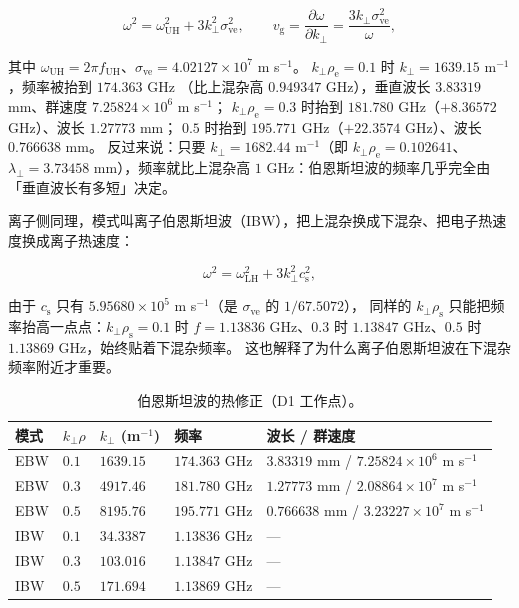 \begin{equation}
\omega^2=\omega_\mathrm{UH}^2+3k_\perp^2\sigma_\mathrm{ve}^2 ,
\qquad
v_\mathrm{g}=\frac{\partial\omega}{\partial k_\perp}=\frac{3k_\perp \sigma_\mathrm{ve}^2}{\omega} ,
\label{eq:app-at-ebw}
\end{equation}

其中 $\omega_\mathrm{UH}=2\pi f_\mathrm{UH}$、$\sigma_\mathrm{ve}=4.02127\times10^{7}$ m s$^{-1}$。
$k_\perp\rho_\mathrm{e}=0.1$ 时 $k_\perp=1639.15$ m$^{-1}$，频率被抬到 $174.363$ GHz
（比上混杂高 $0.949347$ GHz），垂直波长 $3.83319$ mm、群速度 $7.25824\times10^{6}$ m s$^{-1}$；
$k_\perp\rho_\mathrm{e}=0.3$ 时抬到 $181.780$ GHz（$+8.36572$ GHz）、波长 $1.27773$ mm；
$0.5$ 时抬到 $195.771$ GHz（$+22.3574$ GHz）、波长 $0.766638$ mm。
反过来说：只要 $k_\perp=1682.44$ m$^{-1}$（即 $k_\perp\rho_\mathrm{e}=0.102641$、
$\lambda_\perp=3.73458$ mm），频率就比上混杂高 $1$ GHz：伯恩斯坦波的频率几乎完全由
「垂直波长有多短」决定。

离子侧同理，模式叫离子伯恩斯坦波（IBW），把上混杂换成下混杂、把电子热速度换成离子热速度：

\begin{equation}
\omega^2=\omega_\mathrm{LH}^2+3k_\perp^2c_\mathrm{s}^2 ,
\label{eq:app-at-ibw}
\end{equation}

由于 $c_\mathrm{s}$ 只有 $5.95680\times10^{5}$ m s$^{-1}$（是 $\sigma_\mathrm{ve}$ 的 $1/67.5072$），
同样的 $k_\perp\rho_\mathrm{s}$ 只能把频率抬高一点点：$k_\perp\rho_\mathrm{s}=0.1$ 时
$f=1.13836$ GHz、$0.3$ 时 $1.13847$ GHz、$0.5$ 时 $1.13869$ GHz，始终贴着下混杂频率。
这也解释了为什么离子伯恩斯坦波在下混杂频率附近才重要。

\begin{table}[htbp]
\centering
\small
\caption{伯恩斯坦波的热修正（D1 工作点）。}
\label{tab:app-at-bernstein}
\begin{tabular}{p{3.4cm}p{2.9cm}p{3.0cm}p{3.0cm}p{3.4cm}}
\hline
模式 & $k_\perp\rho$ & $k_\perp$ (m$^{-1}$) & 频率 & 波长 / 群速度 \\
\hline
EBW & $0.1$ & $1639.15$ & $174.363$ GHz & $3.83319$ mm / $7.25824\times10^{6}$ m s$^{-1}$ \\
EBW & $0.3$ & $4917.46$ & $181.780$ GHz & $1.27773$ mm / $2.08864\times10^{7}$ m s$^{-1}$ \\
EBW & $0.5$ & $8195.76$ & $195.771$ GHz & $0.766638$ mm / $3.23227\times10^{7}$ m s$^{-1}$ \\
IBW & $0.1$ & $34.3387$ & $1.13836$ GHz & --- \\
IBW & $0.3$ & $103.016$ & $1.13847$ GHz & --- \\
IBW & $0.5$ & $171.694$ & $1.13869$ GHz & --- \\
\hline
\end{tabular}
\end{table}

